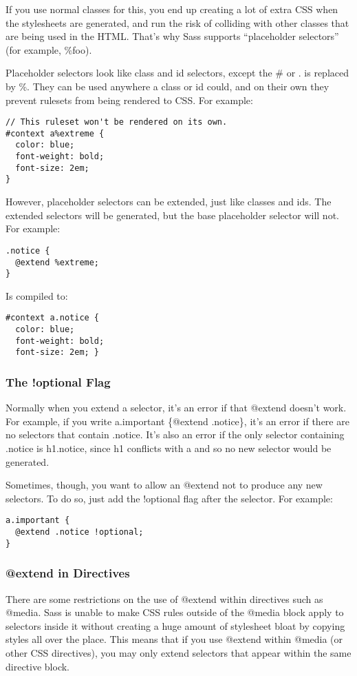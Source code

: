 \documentclass[9pt]{article}
\begin{document}
 If you use normal classes for this, you end up creating a lot of extra CSS when the stylesheets are generated, and run the risk of colliding with other classes that are being used in the HTML. That’s why Sass supports “placeholder selectors” (for example, \%foo).


 Placeholder selectors look like class and id selectors, except the \# or . is replaced by \%. They can be used anywhere a class or id could, and on their own they prevent rulesets from being rendered to CSS. For example:
\begin{verbatim}
// This ruleset won't be rendered on its own.
#context a%extreme {
  color: blue;
  font-weight: bold;
  font-size: 2em;
}
\end{verbatim}


 However, placeholder selectors can be extended, just like classes and ids. The extended selectors will be generated, but the base placeholder selector will not. For example:
\begin{verbatim}
.notice {
  @extend %extreme;
}
\end{verbatim}


 Is compiled to:
\begin{verbatim}
#context a.notice {
  color: blue;
  font-weight: bold;
  font-size: 2em; }
\end{verbatim}
\subsubsection{The !optional Flag}


 Normally when you extend a selector, it’s an error if that @extend doesn’t work. For example, if you write a.important \{@extend .notice\}, it’s an error if there are no selectors that contain .notice. It’s also an error if the only selector containing .notice is h1.notice, since h1 conflicts with a and so no new selector would be generated.


 Sometimes, though, you want to allow an @extend not to produce any new selectors. To do so, just add the !optional flag after the selector. For example:
\begin{verbatim}
a.important {
  @extend .notice !optional;
}
\end{verbatim}
\subsubsection{@extend in Directives}


 There are some restrictions on the use of @extend within directives such as @media. Sass is unable to make CSS rules outside of the @media block apply to selectors inside it without creating a huge amount of stylesheet bloat by copying styles all over the place. This means that if you use @extend within @media (or other CSS directives), you may only extend selectors that appear within the same directive block.
\end{document}
